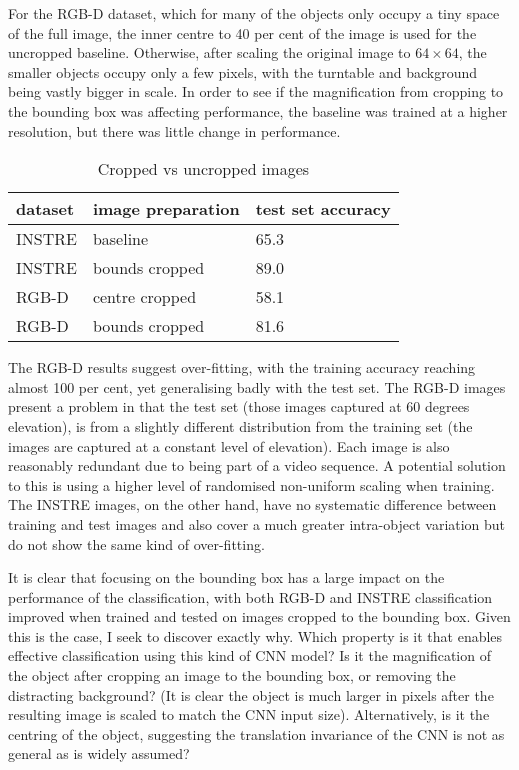 For the RGB-D dataset, which for many of the objects only occupy a tiny space of the full image, the inner centre to 40 per cent of the image is used for the uncropped baseline. Otherwise, after scaling the original image to $ 64 \times 64$, the smaller objects occupy only a few pixels, with the turntable and background being vastly bigger in scale. In order to see if the magnification from cropping to the bounding box was affecting performance,  the baseline was trained at a higher resolution, but there was little change in performance.


\begin{table}[h]
  \centering
    \caption{Cropped vs uncropped images }
    
  \begin{tabular}{ l l l }
    
    dataset & image preparation & test set accuracy \\
    \toprule
    
    INSTRE & baseline &  65.3 \\
    INSTRE & bounds cropped & 89.0 \\
    
    RGB-D & centre cropped & 58.1 \\
    RGB-D & bounds cropped & 81.6 \\
    
    \bottomrule
  \end{tabular}
\label{fig:focus_crop}
\end{table}

The RGB-D results suggest over-fitting, with the training accuracy reaching almost 100 per cent, yet generalising badly with the test set. The RGB-D images present a problem in that the test set (those images captured at 60 degrees elevation), is from a slightly different distribution from the training set (the images are captured at a constant level of elevation). Each image is also reasonably redundant due to being part of a video sequence. A potential solution to this is using a higher level of randomised non-uniform scaling when training. The INSTRE images, on the other hand, have no systematic difference between training and test images and also cover a much greater intra-object variation but do not show the same kind of over-fitting.

It is clear that focusing on the bounding box has a large impact on the performance of the classification, with both RGB-D and INSTRE classification improved when trained and tested on images cropped to the bounding box. Given this is the case, I seek to discover exactly why. Which property is it that enables effective classification using this kind of CNN model? Is it the magnification of the object after cropping an image to the bounding box, or removing the distracting background? (It is clear the object is much larger in pixels after the resulting image is scaled to match the CNN input size). Alternatively, is it the centring of the object, suggesting the translation invariance of the CNN is not as general as is widely assumed?


